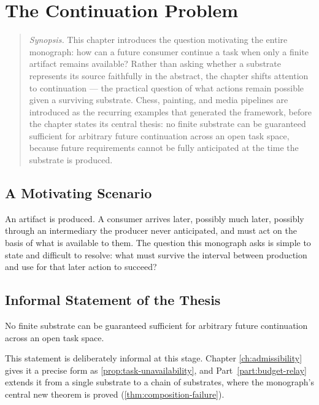 \chapter{The Continuation Problem}
\label{ch:continuation-problem}

\begin{quotation}
\noindent\textit{Synopsis.} This chapter introduces the question motivating
the entire monograph: how can a future consumer continue a task when only a
finite artifact remains available? Rather than asking whether a substrate
represents its source faithfully in the abstract, the chapter shifts
attention to continuation --- the practical question of what actions remain
possible given a surviving substrate. Chess, painting, and media pipelines
are introduced as the recurring examples that generated the framework,
before the chapter states its central thesis: no finite substrate can be
guaranteed sufficient for arbitrary future continuation across an open task
space, because future requirements cannot be fully anticipated at the time
the substrate is produced.
\end{quotation}


\section{A Motivating Scenario}

An artifact is produced. A consumer arrives later, possibly much
later, possibly through an intermediary the producer never
anticipated, and must act on the basis of what is available to them.
The question this monograph asks is simple to state and difficult to
resolve: what must survive the interval between production and use
for that later action to succeed?

\section{Informal Statement of the Thesis}

\begin{principle}
\label{principle:global-insufficiency}
No finite substrate can be guaranteed sufficient for arbitrary future
continuation across an open task space.
\end{principle}

This statement is deliberately informal at this stage. Chapter
\ref{ch:admissibility} gives it a precise form as
\cref{prop:task-unavailability}, and Part~\ref{part:budget-relay}
extends it from a single substrate to a chain of substrates, where the
monograph's central new theorem is proved
(\cref{thm:composition-failure}).

